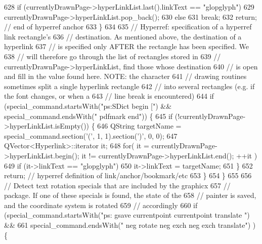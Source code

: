 \begin{DoxyCode}
628         \textcolor{keywordflow}{if} (currentlyDrawnPage->hyperLinkList.last().linkText == \textcolor{stringliteral}{"glopglyph"})
629           currentlyDrawnPage->hyperLinkList.pop\_back();
630         \textcolor{keywordflow}{else}
631           \textcolor{keywordflow}{break};
632       \textcolor{keywordflow}{return}; \textcolor{comment}{// end of hyperref anchor}
633     \}
634 
635     \textcolor{comment}{// Hyperref: specification of a hyperref link rectangle's}
636     \textcolor{comment}{// destination. As mentioned above, the destination of a hyperlink}
637     \textcolor{comment}{// is specified only AFTER the rectangle has been specified. We}
638     \textcolor{comment}{// will therefore go through the list of rectangles stored in}
639     \textcolor{comment}{// currentlyDrawnPage->hyperLinkList, find those whose destination}
640     \textcolor{comment}{// is open and fill in the value found here. NOTE: the character}
641     \textcolor{comment}{// drawing routines sometimes split a single hyperlink rectangle}
642     \textcolor{comment}{// into several rectangles (e.g. if the font changes, or when a}
643     \textcolor{comment}{// line break is encountered)}
644     \textcolor{keywordflow}{if} (special\_command.startsWith(\textcolor{stringliteral}{"ps:SDict begin ["}) && special\_command.endsWith(\textcolor{stringliteral}{" pdfmark end"})) \{
645       \textcolor{keywordflow}{if} (!currentlyDrawnPage->hyperLinkList.isEmpty()) \{
646         QString targetName = special\_command.section(\textcolor{charliteral}{'('}, 1, 1).section(\textcolor{charliteral}{')'}, 0, 0);
647         QVector<Hyperlink>::iterator it;
648         \textcolor{keywordflow}{for}( it = currentlyDrawnPage->hyperLinkList.begin(); it != currentlyDrawnPage->hyperLinkList.end();
       ++it )
649           \textcolor{keywordflow}{if} (it->linkText == \textcolor{stringliteral}{"glopglyph"})
650             it->linkText = targetName;
651       \}
652       \textcolor{keywordflow}{return}; \textcolor{comment}{// hyperref definition of link/anchor/bookmark/etc}
653     \}
654   \}
655 
656   \textcolor{comment}{// Detect text rotation specials that are included by the graphicx}
657   \textcolor{comment}{// package. If one of these specials is found, the state of the}
658   \textcolor{comment}{// painter is saved, and the coordinate system is rotated}
659   \textcolor{comment}{// accordingly}
660   \textcolor{keywordflow}{if} (special\_command.startsWith(\textcolor{stringliteral}{"ps: gsave currentpoint currentpoint translate "}) &&
661       special\_command.endsWith(\textcolor{stringliteral}{" neg rotate neg exch neg exch translate"}) ) \{

\end{DoxyCode}
